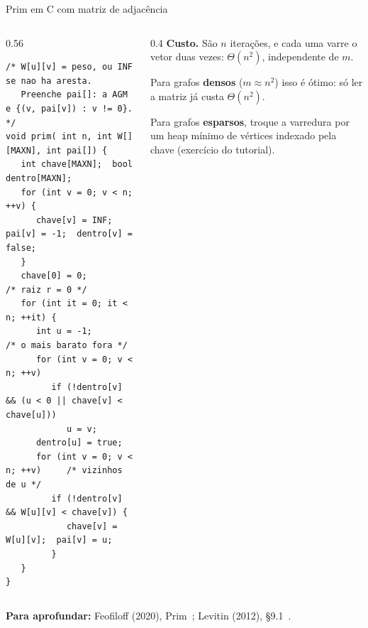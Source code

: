 \documentclass[aspectratio=169,xcolor=table]{beamer}
\newcommand{\fonte}[1]{%
  \vfill
  {\tiny\color{gray!55!black}\textbf{Para aprofundar:} #1\par}%
}
\begin{document}
\begin{frame}[fragile]{Prim em C com matriz de adjacência}
  \begin{columns}[T]
    \begin{column}{0.56\textwidth}
\begin{lstlisting}[basicstyle=\ttfamily\tiny]
/* W[u][v] = peso, ou INF se nao ha aresta.
   Preenche pai[]: a AGM e {(v, pai[v]) : v != 0}. */
void prim( int n, int W[][MAXN], int pai[]) {
   int chave[MAXN];  bool dentro[MAXN];
   for (int v = 0; v < n; ++v) {
      chave[v] = INF;  pai[v] = -1;  dentro[v] = false;
   }
   chave[0] = 0;                      /* raiz r = 0 */
   for (int it = 0; it < n; ++it) {
      int u = -1;                     /* o mais barato fora */
      for (int v = 0; v < n; ++v)
         if (!dentro[v] && (u < 0 || chave[v] < chave[u]))
            u = v;
      dentro[u] = true;
      for (int v = 0; v < n; ++v)     /* vizinhos de u */
         if (!dentro[v] && W[u][v] < chave[v]) {
            chave[v] = W[u][v];  pai[v] = u;
         }
   }
}
\end{lstlisting}
    \end{column}
    \begin{column}{0.4\textwidth}
      \scriptsize
      \textbf{Custo.} São $n$ iterações, e cada uma varre o vetor duas vezes:
      $\Theta(n^2)$, independente de $m$.
      \medskip

      Para grafos \textbf{densos} ($m \approx n^2$) isso é ótimo: só ler a matriz já custa
      $\Theta(n^2)$.
      \medskip

      Para grafos \textbf{esparsos}, troque a varredura por um heap mínimo de vértices
      indexado pela chave (exercício do tutorial).
    \end{column}
  \end{columns}
  \fonte{Feofiloff (2020), Prim~\cite{feofiloff2020grafos};
    Levitin (2012), \S 9.1~\cite{levitin2012introduction}.}
\end{frame}
\end{document}

